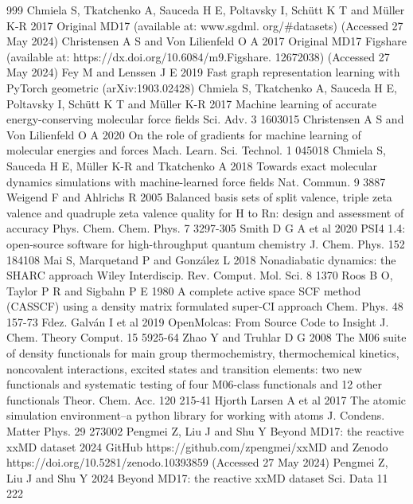 \documentclass[12pt]{article}
\begin{document}
\begin{thebibliography}{999}
 Chmiela S, Tkatchenko A, Sauceda H E, Poltavsky I, Schütt K T and Müller K-R 2017 Original MD17 (available at: www.sgdml. org/\#datasets) (Accessed 27 May 2024)
 Christensen A S and Von Lilienfeld O A 2017 Original MD17 Figshare (available at: https://dx.doi.org/10.6084/m9.Figshare. 12672038) (Accessed 27 May 2024)
 Fey M and Lenssen J E 2019 Fast graph representation learning with PyTorch geometric (arXiv:1903.02428)
 Chmiela S, Tkatchenko A, Sauceda H E, Poltavsky I, Schütt K T and Müller K-R 2017 Machine learning of accurate energy-conserving molecular force fields Sci. Adv. 3 1603015
 Christensen A S and Von Lilienfeld O A 2020 On the role of gradients for machine learning of molecular energies and forces Mach. Learn. Sci. Technol. 1 045018
 Chmiela S, Sauceda H E, Müller K-R and Tkatchenko A 2018 Towards exact molecular dynamics simulations with machine-learned force fields Nat. Commun. 9 3887
 Weigend F and Ahlrichs R 2005 Balanced basis sets of split valence, triple zeta valence and quadruple zeta valence quality for H to Rn: design and assessment of accuracy Phys. Chem. Chem. Phys. 7 3297-305
 Smith D G A et al 2020 PSI4 1.4: open-source software for high-throughput quantum chemistry J. Chem. Phys. 152 184108
 Mai S, Marquetand P and González L 2018 Nonadiabatic dynamics: the SHARC approach Wiley Interdiscip. Rev. Comput. Mol. Sci. 8 1370
 Roos B O, Taylor P R and Sigbahn P E 1980 A complete active space SCF method (CASSCF) using a density matrix formulated super-CI approach Chem. Phys. 48 157-73
 Fdez. Galván I et al 2019 OpenMolcas: From Source Code to Insight J. Chem. Theory Comput. 15 5925-64
 Zhao Y and Truhlar D G 2008 The M06 suite of density functionals for main group thermochemistry, thermochemical kinetics, noncovalent interactions, excited states and transition elements: two new functionals and systematic testing of four M06-class functionals and 12 other functionals Theor. Chem. Acc. 120 215-41
 Hjorth Larsen A et al 2017 The atomic simulation environment--a python library for working with atoms J. Condens. Matter Phys. 29 273002
 Pengmei Z, Liu J and Shu Y Beyond MD17: the reactive xxMD dataset 2024 GitHub https://github.com/zpengmei/xxMD and Zenodo https://doi.org/10.5281/zenodo.10393859 (Accessed 27 May 2024)
 Pengmei Z, Liu J and Shu Y 2024 Beyond MD17: the reactive xxMD dataset Sci. Data 11 222

\end{thebibliography}
\end{document}
